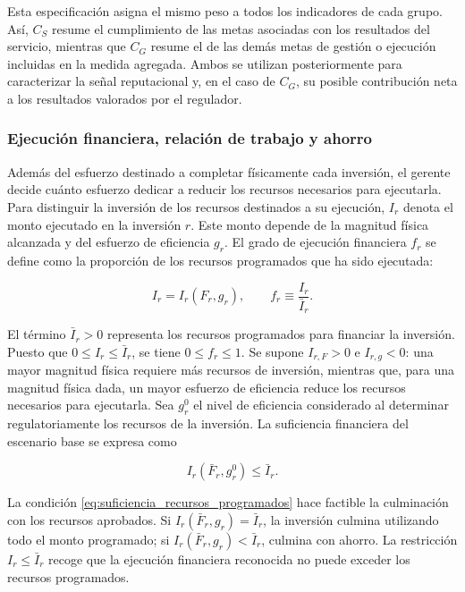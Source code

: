 Esta especificación asigna el mismo peso a todos los indicadores de cada grupo. Así, \(C_S\) resume el cumplimiento de las metas asociadas con los resultados del servicio, mientras que \(C_G\) resume el de las demás metas de gestión o ejecución incluidas en la medida agregada. Ambos se utilizan posteriormente para caracterizar la señal reputacional y, en el caso de \(C_G\), su posible contribución neta a los resultados valorados por el regulador.

\subsubsection{Ejecución financiera, relación de trabajo y ahorro}

Además del esfuerzo destinado a completar físicamente cada inversión, el gerente decide cuánto esfuerzo dedicar a reducir los recursos necesarios para ejecutarla. Para distinguir la inversión de los recursos destinados a su ejecución, \(I_r\) denota el monto ejecutado en la inversión \(r\). Este monto depende de la magnitud física alcanzada y del esfuerzo de eficiencia \(g_r\). El grado de ejecución financiera \(f_r\) se define como la proporción de los recursos programados que ha sido ejecutada:

\begin{equation}
\label{eq:inversion_ejecutada}
I_r=I_r(F_r,g_r),
\qquad
f_r\equiv\frac{I_r}{\bar I_r}.
\end{equation}

El término \(\bar I_r>0\) representa los recursos programados para financiar la inversión. Puesto que \(0\leq I_r\leq\bar I_r\), se tiene \(0\leq f_r\leq1\). Se supone \(I_{r,F}>0\) e \(I_{r,g}<0\): una mayor magnitud física requiere más recursos de inversión, mientras que, para una magnitud física dada, un mayor esfuerzo de eficiencia reduce los recursos necesarios para ejecutarla. Sea \(g_r^0\) el nivel de eficiencia considerado al determinar regulatoriamente los recursos de la inversión. La suficiencia financiera del escenario base se expresa como

\begin{equation}
\label{eq:suficiencia_recursos_programados}
I_r(\bar F_r,g_r^0)
\leq
\bar I_r.
\end{equation}

La condición \eqref{eq:suficiencia_recursos_programados} hace factible la culminación con los recursos aprobados. Si \(I_r(\bar F_r,g_r)=\bar I_r\), la inversión culmina utilizando todo el monto programado; si \(I_r(\bar F_r,g_r)<\bar I_r\), culmina con ahorro. La restricción \(I_r\leq\bar I_r\) recoge que la ejecución financiera reconocida no puede exceder los recursos programados.

